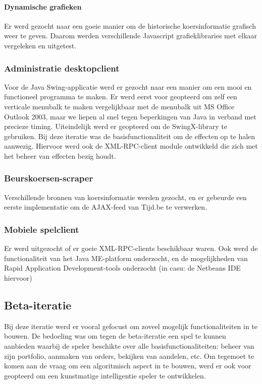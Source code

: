 \paragraph{Dynamische grafieken}
Er werd gezocht naar een goeie manier om de historische koersinformatie grafisch weer te geven. Daarom werden verschillende Javascript grafieklibraries met elkaar vergeleken en uitgetest.

\subsubsection{Administratie desktopclient}
Voor de Java Swing-applicatie werd er gezocht naar een manier om een mooi en functioneel programma te maken. Er werd eerst voor geopteerd om zelf een verticale menubalk te maken vergelijkbaar met de menubalk uit MS Office Outlook 2003, maar we liepen al snel tegen beperkingen van Java in verband met precieze timing. Uiteindelijk werd er geopteerd om de SwingX-library te gebruiken.
Bij deze iteratie was de basisfunctionaliteit om de effecten op te halen aanwezig. Hiervoor werd ook de XML-RPC-client module ontwikkeld die zich met het beheer van effecten bezig houdt.

\subsubsection{Beurskoersen-scraper}
Verschillende bronnen van koersinformatie werden gezocht, en er gebeurde een eerste implementatie om de AJAX-feed van Tijd.be te verwerken.

\subsubsection{Mobiele spelclient}
Er werd uitgezocht of er goeie XML-RPC-clients beschikbaar waren. Ook werd de functionaliteit van het Java ME-platform onderzocht, en de mogelijkheden van Rapid Application Development-tools onderzocht (in casu: de Netbeans IDE hiervoor)


\subsection{Beta-iteratie}
Bij deze iteratie werd er vooral gefocust om zoveel mogelijk functionaliteiten in te bouwen. De bedoeling was om tegen de beta-iteratie een spel te kunnen aanbieden waarbij de speler beschikte over alle basisfunctionaliteiten: beheer van zijn portfolio, aanmaken van orders, bekijken van aandelen, etc.
Om tegemoet te komen aan de vraag om een algoritmisch aspect in te bouwen, werd er ook voor geopteerd om een kunstmatige intelligentie speler te ontwikkelen.

